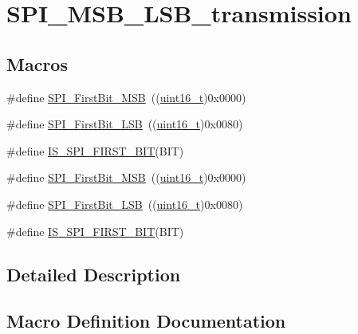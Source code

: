 \hypertarget{group___s_p_i___m_s_b___l_s_b__transmission}{}\section{S\+P\+I\+\_\+\+M\+S\+B\+\_\+\+L\+S\+B\+\_\+transmission}
\label{group___s_p_i___m_s_b___l_s_b__transmission}
\subsection*{Macros}
\begin{DoxyCompactItemize}
\item 
\#define \hyperlink{group___s_p_i___m_s_b___l_s_b__transmission_ga45e688f93a93b605886240cad23bc2eb}{S\+P\+I\+\_\+\+First\+Bit\+\_\+\+M\+SB}~((\hyperlink{_p_e___types_8h_a1f1825b69244eb3ad2c7165ddc99c956}{uint16\+\_\+t})0x0000)
\item 
\#define \hyperlink{group___s_p_i___m_s_b___l_s_b__transmission_ga5ef57fca79434cbc517e4ede548ca02d}{S\+P\+I\+\_\+\+First\+Bit\+\_\+\+L\+SB}~((\hyperlink{_p_e___types_8h_a1f1825b69244eb3ad2c7165ddc99c956}{uint16\+\_\+t})0x0080)
\item 
\#define \hyperlink{group___s_p_i___m_s_b___l_s_b__transmission_gabee8e0302741f4a5c41b96af640c63ad}{I\+S\+\_\+\+S\+P\+I\+\_\+\+F\+I\+R\+S\+T\+\_\+\+B\+IT}(B\+IT)
\item 
\#define \hyperlink{group___s_p_i___m_s_b___l_s_b__transmission_ga45e688f93a93b605886240cad23bc2eb}{S\+P\+I\+\_\+\+First\+Bit\+\_\+\+M\+SB}~((\hyperlink{_p_e___types_8h_a1f1825b69244eb3ad2c7165ddc99c956}{uint16\+\_\+t})0x0000)
\item 
\#define \hyperlink{group___s_p_i___m_s_b___l_s_b__transmission_ga5ef57fca79434cbc517e4ede548ca02d}{S\+P\+I\+\_\+\+First\+Bit\+\_\+\+L\+SB}~((\hyperlink{_p_e___types_8h_a1f1825b69244eb3ad2c7165ddc99c956}{uint16\+\_\+t})0x0080)
\item 
\#define \hyperlink{group___s_p_i___m_s_b___l_s_b__transmission_gabee8e0302741f4a5c41b96af640c63ad}{I\+S\+\_\+\+S\+P\+I\+\_\+\+F\+I\+R\+S\+T\+\_\+\+B\+IT}(B\+IT)
\end{DoxyCompactItemize}


\subsection{Detailed Description}


\subsection{Macro Definition Documentation}

